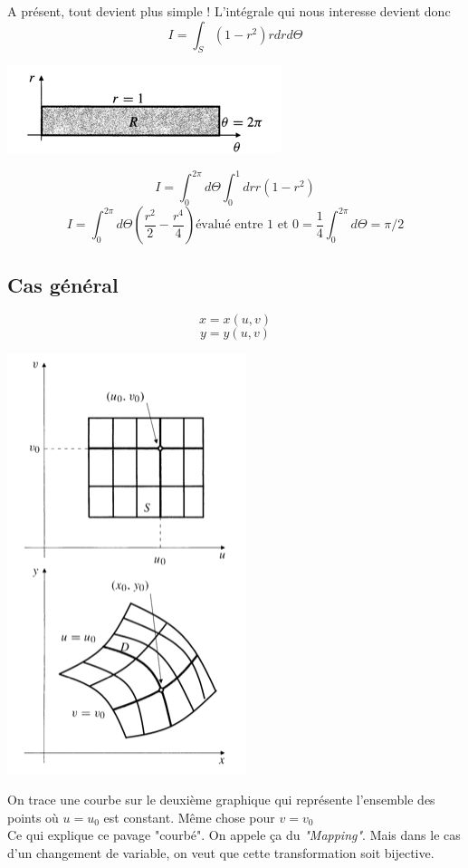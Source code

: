  A présent, tout devient plus simple ! L'intégrale qui nous interesse devient donc
 \[I=\int_S (1-r^2)r dr d\Theta\]
\begin{center}
 \includegraphics[scale=0.7]{image7.png}
\end{center}
 \[I=\int_0^{2\pi} d\Theta \int_0^1 dr r (1-r^2)\]
 \[I = \int_0^{2\pi} d \Theta \left(\frac{r^2}{2}-\frac{r^4}{4} \right) \text{évalué entre 1 et 0} = \frac{1}{4} \int_0^{2\pi} d \Theta = \pi/2 \]

\subsection{Cas général}

$$x=x(u,v)$$
$$y=y(u,v)$$
\begin{center}
\includegraphics[scale=0.5]{image8.png}
\end{center}

On trace une courbe sur le deuxième graphique qui représente l'ensemble des points où $u=u_0$ est constant. Même chose pour $v=v_0$\\
Ce qui explique ce pavage "courbé". On appele ça du \textit{"Mapping"}. Mais dans le cas d'un changement de variable, on veut que cette transformation soit bijective.\\

